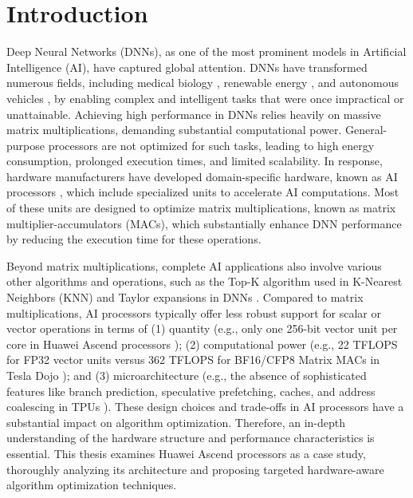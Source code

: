 \chapter{Introduction}
\label{chp_1_introduction}

Deep Neural Networks (DNNs), as one of the most prominent models in Artificial Intelligence (AI), have captured global attention. DNNs have transformed numerous fields, including medical biology \cite{zitnik2019machine}, renewable energy \cite{gensler2016deep}, and autonomous vehicles \cite{tian2018deeptest}, by enabling complex and intelligent tasks that were once impractical or unattainable. Achieving high performance in DNNs relies heavily on massive matrix multiplications, demanding substantial computational power. General-purpose processors are not optimized for such tasks, leading to high energy consumption, prolonged execution times, and limited scalability. In response, hardware manufacturers have developed domain-specific hardware, known as AI processors \cite{Dojo, DBLP:conf/isca/JouppiK0MNNPSST23, Mi300, H100, DBLP:conf/isscc/OuyangDML21, DBLP:conf/hotchips/LiaoTXZ19, 910}, which include specialized units to accelerate AI computations. Most of these units are designed to optimize matrix multiplications, known as matrix multiplier-accumulators (MACs), which substantially enhance DNN performance by reducing the execution time for these operations.

Beyond matrix multiplications, complete AI applications also involve various other algorithms and operations, such as the Top-K algorithm used in K-Nearest Neighbors (KNN) \cite{1053964} and Taylor expansions in DNNs \cite{DBLP:conf/cvpr/JinYWMH23}. Compared to matrix multiplications, AI processors typically offer less robust support for scalar or vector operations in terms of (1) quantity (e.g., only one 256-bit vector unit per core in Huawei Ascend processors \cite{DBLP:conf/hotchips/LiaoTXZ19}); (2) computational power (e.g., 22 TFLOPS for FP32 vector units versus 362 TFLOPS for BF16/CFP8 Matrix MACs in Tesla Dojo \cite{Dojo}); and (3) microarchitecture (e.g., the absence of sophisticated features like branch prediction, speculative prefetching, caches, and address coalescing in TPUs \cite{DBLP:conf/isca/JouppiYPPABBBBB17}). These design choices and trade-offs in AI processors have a substantial impact on algorithm optimization. Therefore, an in-depth understanding of the hardware structure and performance characteristics is essential. This thesis examines Huawei Ascend processors \cite{DBLP:conf/hotchips/LiaoTXZ19} as a case study, thoroughly analyzing its architecture and proposing targeted hardware-aware algorithm optimization techniques.

